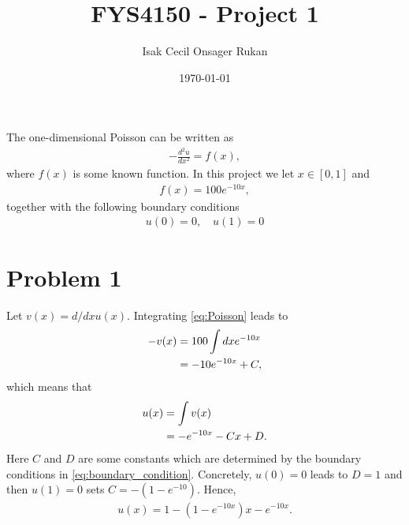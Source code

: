 \documentclass[english,notitlepage,reprint,nofootinbib]{revtex4-2}  %
\begin{document}
\title{FYS4150 - Project 1}  %
\author{Isak Cecil Onsager Rukan} %
\date{\today}                             %
\noaffiliation                            %
\maketitle
The one-dimensional Poisson can be written as 
\begin{align}
    -\frac{d^2u}{dx^2} = f(x),  \label{eq:Poisson}
\end{align}
where $f(x)$ is some known function. In this project we let \(x\in[0,1]\) and
\begin{align}
    f(x) = 100e^{-10x}, \label{eq:f_x}
\end{align}
together with the following boundary conditions
\begin{align}
    u(0)=0, \quad u(1)=0 \label{eq:boundary_condition}
\end{align}
\section{Problem 1}
Let $v(x)=d/dx u(x)$. Integrating \eqref{eq:Poisson} leads to 
\begin{align}
    -v(x) &= 100\int dxe^{-10x}
    \notag \\
    &= -10e^{-10x} + C,
\end{align}
which means that 
\begin{align}
    u(x) &= \int v(x) 
    \notag \\
    &= -e^{-10x} - Cx + D.
\end{align}
Here $C$ and $D$ are some constants which are determined by the boundary conditions in \eqref{eq:boundary_condition}. Concretely, \(u(0)=0\) leads to $D=1$ and then \(u(1)=0\) sets \(C=-(1-e^{-10})\). Hence,
\begin{align}
    u(x) = 1 - (1 - e^{-10x})x - e^{-10x}.  \label{eq:u_x}
\end{align}
\end{document}
